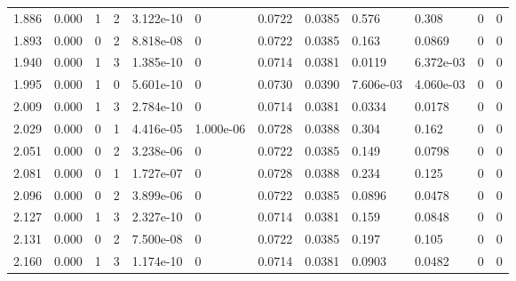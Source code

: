 \documentclass[preview]{standalone}
\begin{document}
{{{\begin{tabular}{L{1.2cm}C{1.2cm} C{0.3cm}C{0.5cm} C{1.4cm}C{1.4cm} C{1.4cm}C{1.4cm} C{1.6cm}C{1.6cm} C{1.6cm}C{1.6cm}}
  1.886  &  0.000  & 1     &  2 &  3.122e-10  & 0  &  0.0722&   0.0385& 0.576 & 0.308   &  0 & 0  \\ 
  1.893  &  0.000  & 0     &  2 &  8.818e-08  & 0  &  0.0722&   0.0385& 0.163 & 0.0869   &  0 & 0  \\ 
  1.940  &  0.000  & 1     &  3 &  1.385e-10  & 0  &  0.0714&   0.0381& 0.0119 & 6.372e-03   &  0 & 0  \\ 
  1.995  &  0.000  & 1     &  0 &  5.601e-10  & 0  &  0.0730&   0.0390& 7.606e-03 & 4.060e-03   &  0 & 0  \\ 
  2.009  &  0.000  & 1     &  3 &  2.784e-10  & 0  &  0.0714&   0.0381& 0.0334 & 0.0178   &  0 & 0  \\ 
  2.029  &  0.000  & 0     &  1 &  4.416e-05  & 1.000e-06  &  0.0728&   0.0388& 0.304 & 0.162   &  0 & 0  \\ 
  2.051  &  0.000  & 0     &  2 &  3.238e-06  & 0  &  0.0722&   0.0385& 0.149 & 0.0798   &  0 & 0  \\ 
  2.081  &  0.000  & 0     &  1 &  1.727e-07  & 0  &  0.0728&   0.0388& 0.234 & 0.125   &  0 & 0  \\ 
  2.096  &  0.000  & 0     &  2 &  3.899e-06  & 0  &  0.0722&   0.0385& 0.0896 & 0.0478   &  0 & 0  \\ 
  2.127  &  0.000  & 1     &  3 &  2.327e-10  & 0  &  0.0714&   0.0381& 0.159 & 0.0848   &  0 & 0  \\ 
  2.131  &  0.000  & 0     &  2 &  7.500e-08  & 0  &  0.0722&   0.0385& 0.197 & 0.105   &  0 & 0  \\ 
  2.160  &  0.000  & 1     &  3 &  1.174e-10  & 0  &  0.0714&   0.0381& 0.0903 & 0.0482   &  0 & 0  \\ 
\hline 
\end{tabular} 

}}}
\end{document}
